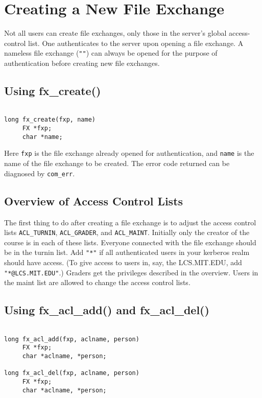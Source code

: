 \section{Creating a New File Exchange}

Not all users can create file exchanges, only those in the server's
global access-control list.  One authenticates to the server upon
opening a file exchange.  A nameless file exchange (\verb+""+) can always be
opened for the purpose of authentication before creating new file
exchanges.

\subsection{Using fx\_create()}

\begin{verbatim}

long fx_create(fxp, name)
     FX *fxp;
     char *name;

\end{verbatim}

Here \verb+fxp+ is the file exchange already opened for
authentication, and \verb+name+ is the name of the file exchange to be
created.  The error code returned can be diagnosed by \verb+com_err+.

\subsection{Overview of Access Control Lists}

The first thing to do after creating a file exchange is to adjust the
access control lists \verb+ACL_TURNIN+, \verb+ACL_GRADER+, and
\verb+ACL_MAINT+.  Initially only the creator of the course is in
each of these lists.  Everyone connected with the file exchange should
be in the turnin list.  Add \verb+"*"+ if all authenticated users in
your kerberos realm should have access.  (To give access to users in,
say, the LCS.MIT.EDU, add \verb+"*@LCS.MIT.EDU"+.)  Graders get the
privileges described in the overview.  Users in the maint list are
allowed to change the access control lists.

\subsection{Using fx\_acl\_add() and fx\_acl\_del()}

\begin{verbatim}

long fx_acl_add(fxp, aclname, person)
     FX *fxp;
     char *aclname, *person;

long fx_acl_del(fxp, aclname, person)
     FX *fxp;
     char *aclname, *person;

\end{verbatim}


